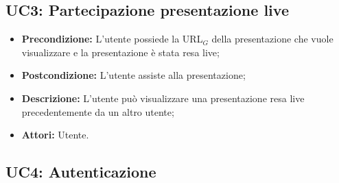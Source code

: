 \subsection{ UC3: Partecipazione presentazione live}

\begin{itemize}
	\item \textbf{Precondizione:} L'utente possiede la URL$_G$ della presentazione che vuole visualizzare e la presentazione è stata resa live;
	\item \textbf{Postcondizione:} L'utente assiste alla presentazione;
	\item \textbf{Descrizione:} L'utente può visualizzare una presentazione resa live precedentemente da un altro utente;
	\item \textbf{Attori:} Utente.
\end{itemize}
\subsection{ UC4: Autenticazione}


